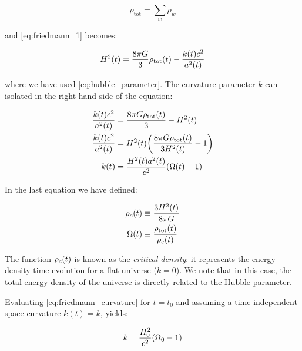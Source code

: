 \begin{equation}
        \rho_{\text{tot}} = \sum_w \rho_w 
\end{equation}

and \autoref{eq:friedmann_1} becomes:

\begin{equation}
        H^2\qty(t) = \frac{8\pi G}{3} \rho_{\text{tot}}\qty(t) -
        \frac{k\qty(t) c^2}{a^2\qty(t)}
\end{equation}

where we have used \autoref{eq:hubble_parameter}. The curvature parameter
$k$ can isolated in the right-hand side of the equation:

\begin{equation}
        \begin{split}
                \frac{k\qty(t) c^2}{a^2\qty(t)} & = 
                \frac{8\pi G \rho_{\text{tot}}\qty(t)}{3} - H^2\qty(t) \\
                \frac{k\qty(t) c^2}{a^2\qty(t)} & = 
                H^2\qty(t) \qty(\frac{8\pi G \rho_{\text{tot}}\qty(t)}{3H^2\qty(t)} - 1) \\
                k(t) & = \frac{H^2\qty(t) a^2\qty(t)}{c^2} \qty(\Omega\qty(t) - 1) \\
        \end{split}
        \label{eq:friedmann_curvature}
\end{equation}

In the last equation we have defined:

\begin{align}
        \rho_c\qty(t) & \equiv \frac{3H^2\qty(t)}{8\pi G} \\
        \Omega\qty(t) & \equiv \frac{\rho_{\text{tot}}\qty(t)}{\rho_c\qty(t)}
\end{align}

The function $\rho_c\qty(t)$ is known as the \emph{critical density}: it
represents the energy density time evolution for a flat universe ($k = 0$).
We note that in this case, the total energy density of the universe is
directly related to the Hubble parameter.

Evaluating \autoref{eq:friedmann_curvature} for $t = t_0$ and assuming a
time independent space curvature $k(t) = k$, yields:

\begin{equation}
        k = \frac{H^2_0}{c^2} \qty(\Omega_0 - 1) \\
\end{equation}

